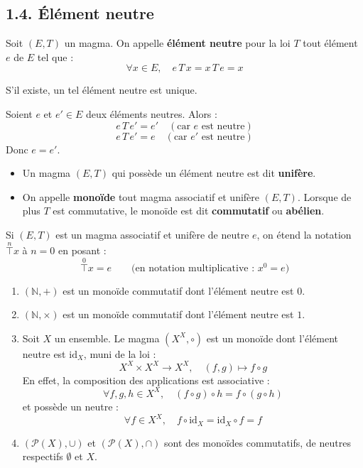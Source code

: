 \documentclass[a4paper,11pt]{article}
\newcommand{\N}{\mathbb{N}}
\newcommand{\mot}[1]{\textcolor{bordeaux}{\textbf{#1}}}
\begin{document}
\newpage
\subsection{1.4. Élément neutre}

\begin{definition}
Soit $(E, T)$ un magma. On appelle \mot{élément neutre} pour la loi $T$ tout élément $e$ de $E$ tel que :
\[
\forall x \in E, \quad e \, T \, x = x \, T \, e = x
\]
\end{definition}

\begin{proposition}
S'il existe, un tel élément neutre est unique.
\end{proposition}

\begin{demonstration}
Soient $e$ et $e' \in E$ deux éléments neutres. Alors :
\[
e \, T \, e' = e' \quad (\text{car } e \text{ est neutre})
\]
\[
e \, T \, e' = e \quad (\text{car } e' \text{ est neutre})
\]
Donc $e = e'$.
\end{demonstration}

\begin{definition}
\begin{itemize}
    \item Un magma $(E, T)$ qui possède un élément neutre est dit \mot{unifère}.
    \item On appelle \mot{monoïde} tout magma associatif et unifère $(E, T)$. Lorsque de plus $T$ est commutative, le monoïde est dit \mot{commutatif} ou \mot{abélien}.
\end{itemize}
\end{definition}

\begin{remarque}[Convention]
Si $(E, T)$ est un magma associatif et unifère de neutre $e$, on étend la notation $\overset{n}{\top} x$ à $n = 0$ en posant :
\[
\overset{0}{\top} x = e \qquad \text{(en notation multiplicative : } x^0 = e\text{)}
\]
\end{remarque}

\begin{exemples}
\begin{enumerate}
    \item $(\N, +)$ est un monoïde commutatif dont l'élément neutre est $0$.
    \item $(\N, \times)$ est un monoïde commutatif dont l'élément neutre est $1$.
    \item Soit $X$ un ensemble. Le magma $(X^X, \circ)$ est un monoïde dont l'élément neutre est $\mathrm{id}_X$, muni de la loi :
    \[
    X^X \times X^X \longrightarrow X^X, \quad (f, g) \longmapsto f \circ g
    \]
    En effet, la composition des applications est associative :
    \[
    \forall f, g, h \in X^X, \quad (f \circ g) \circ h = f \circ (g \circ h)
    \]
    et possède un neutre :
    \[
    \forall f \in X^X, \quad f \circ \mathrm{id}_X = \mathrm{id}_X \circ f = f
    \]
    \item $(\mathcal{P}(X), \cup)$ et $(\mathcal{P}(X), \cap)$ sont des monoïdes commutatifs, de neutres respectifs $\emptyset$ et $X$.
\end{enumerate}
\end{exemples}
\end{document}
